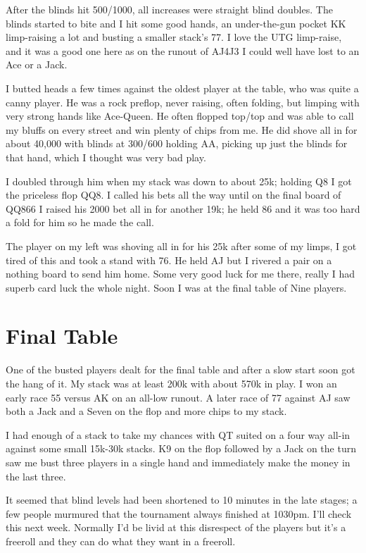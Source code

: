 After the blinds hit 500/1000, all increases were straight blind doubles.
The blinds started to bite and I hit some good hands, an under-the-gun
pocket KK limp-raising a lot and busting a smaller stack's 77. I love
the UTG limp-raise, and it was a good one here as on the runout of
AJ4J3 I could well have lost to an Ace or a Jack.

I butted heads a few times against the oldest player at the table,
who was quite a canny player. He was a rock preflop, never raising,
often folding, but limping with very strong hands like Ace-Queen.
He often flopped top/top and was able to call my bluffs on every
street and win plenty of chips from me. He did shove all in for
about 40,000 with blinds at 300/600 holding AA, picking up just
the blinds for that hand, which I thought was very bad play.

I doubled through him when my stack was down to about 25k; holding
Q8 I got the priceless flop QQ8. I called his bets all the way
until on the final board of QQ866 I raised his 2000 bet all in
for another 19k; he held 86 and it was too hard a fold for him
so he made the call.

The player on my left was shoving all in for his 25k after some
of my limps, I got tired of this and took a stand with 76. He
held AJ but I rivered a pair on a nothing board to send him
home. Some very good luck for me there, really I had superb
card luck the whole night. Soon I was at the final table of
Nine players.

\section{Final Table}

One of the busted players dealt for the final table and after
a slow start soon got the hang of it. My stack was at least
200k with about 570k in play. I won an early race 55 versus AK
on an all-low runout. A later race of 77 against AJ saw
both a Jack and a Seven on the flop and more chips to my stack.

I had enough of a stack to take my chances with QT suited on a
four way all-in against some small 15k-30k stacks. K9 on the flop
followed by a Jack on the turn saw me bust three players in
a single hand and immediately make the money in the last three.

It seemed that blind levels had been shortened to 10 minutes in
the late stages; a few people murmured that the tournament
always finished at 1030pm. I'll check this next week. Normally
I'd be livid at this disrespect of the players but it's
a freeroll and they can do what they want in a freeroll.


